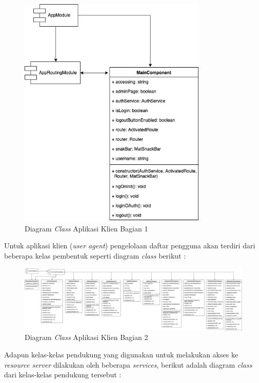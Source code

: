 \documentclass[pdftex,12pt, oneside]{article}
\begin{document}
\begin{figure}[H]
	\centering
	\includegraphics[width=0.8\textwidth]{./resources/class-dia-fe-1}
	\caption{Diagram \textit{Class} Aplikasi Klien Bagian 1}
	\label{fig:class-dia-fe-1}
\end{figure}

Untuk aplikasi klien (\textit{user agent}) pengelolaan daftar pengguna akan terdiri dari beberapa kelas pembentuk seperti diagram \textit{class} berikut :

\begin{figure}[H]
	\centering
	\includegraphics[width=1\textwidth]{./resources/class-dia-fe-2}
	\caption{Diagram \textit{Class} Aplikasi Klien Bagian 2}
	\label{fig:class-dia-fe-2}
\end{figure}

Adapun kelas-kelas pendukung yang digunakan untuk melakukan akses ke \textit{resource server} dilakukan oleh beberapa \textit{services}, berikut adalah diagram \textit{class} dari kelas-kelas pendukung tersebut :
\end{document}
